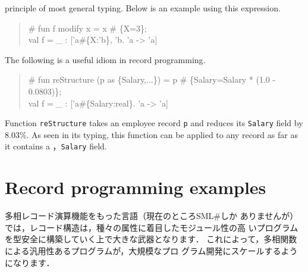 \documentclass{jbook}
\newif\ifjp
\newcommand{\txt}[2]{#2}
\newcommand{\smlsharp}{SML\#}
\begin{document}
principle of most general typing.
	Below is an example using this expression.
\begin{tt}\begin{quote}
\# fun f modify x = x \# \{X=3\};\\
val f = \_ : ['a\#\{X:'b\}, 'b.  'a -> 'a]
\end{quote}\end{tt}
	The following is a useful idiom in record programming.
\begin{tt}\begin{quote}
\# fun reStructure (p as \{Salary,...\}) = p \# \{Salary=Salary * (1.0 - 0.0803)\};\\
val f = \_ : ['a\#\{Salary:real\}.  'a -> 'a]
\end{quote}\end{tt}
	Function {\tt reStructure} takes an employee record {\tt p} and 
reduces its {\tt Salary} field by 8.03\%.
	As seen in its typing, this function can be applied to any
record as far as it contains a ，{\tt Salary} field.
\fi%

\section{\txt{レコードプログラミング例}{Record programming examples}}
\label{sec:extensionRecordProgramming}

\ifjp%
	多相レコード演算機能をもった言語（現在のところ\smlsharp{}しか
ありませんが）では，レコード構造は，種々の属性に着目したモジュール性の高
いプログラムを型安全に構築していく上で大きな武器となります．
	これによって，多相関数による汎用性あるプログラムが，大規模なプロ
グラム開発にスケールするようになります．
\end{document}

